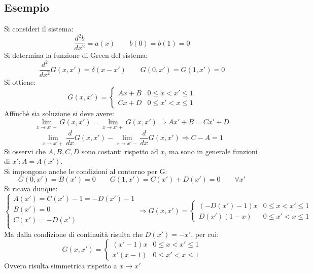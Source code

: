 \documentclass[twoside]{article}
\begin{document}
\subsection{Esempio}
Si consideri il sistema:
\begin{equation}
    \frac{d^2 b}{dx^2}=a(x) \qquad b(0)=b(1)=0
\end{equation}
Si determina la funzione di Green del sistema:
\begin{equation}
    \frac{d^2}{dx^2}G(x,x')=\delta(x-x') \qquad G(0,x')=G(1,x')=0
\end{equation}
Si ottiene:
\begin{equation}
    G(x,x')=\begin{cases}
    Ax+B & 0\le x<x'\le 1\\
    Cx+D & 0\le x'<x\le 1
    \end{cases}
\end{equation}
Affinchè sia soluzione si deve avere:
\begin{equation}
    \lim_{x\to x'-}G(x,x')=\lim_{x\to x'+}G(x,x')\Longrightarrow Ax'+B=Cx'+D
\end{equation}
\begin{equation}
    \lim_{x\to x'+}\frac{d}{dx}G(x,x')-\lim_{x\to x'-}\frac{d}{dx}G(x,x')\Longrightarrow C-A=1
\end{equation}
Si osservi che $A,B,C,D$ sono costanti rispetto ad $x$, ma sono in generale funzioni di $x': A=A(x')$.\\
Si impongono anche le condizioni al contorno per G:
\begin{equation}
    G(0,x')=B(x')=0 \qquad G(1,x')=C(x')+D(x')=0 \qquad \forall x'
\end{equation}
Si ricava dunque:
\begin{equation}
    \begin{cases}
    A(x')=C(x')-1=-D(x')-1\\
    B(x')=0\\
    C(x')=-D(x')\\
    \end{cases}\Longrightarrow G(x,x')=\begin{cases}
    (-D(x')-1)x &  0\le x<x'\le 1\\
    D(x')(1-x) & 0\le x'<x\le 1
    \end{cases}
\end{equation}
Ma dalla condizione di continuità risulta che $D(x')=-x'$, per cui:
\begin{equation}
    G(x,x')=\begin{cases}
    (x'-1)x &  0\le x<x'\le 1\\
    x'(x-1) & 0\le x'<x\le 1
    \end{cases}
\end{equation}
Ovvero risulta simmetrica rispetto a $x\to x'$
\end{document}
